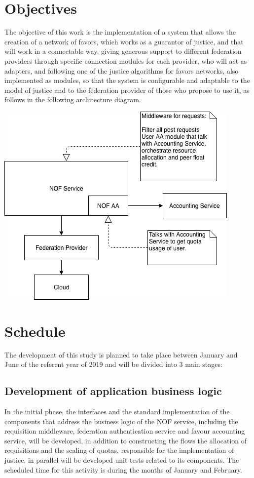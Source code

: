 \documentclass{article}
\begin{document}
\section{Objectives}
The objective of this work is the implementation of a system that allows the creation of a network of favors, which works as a guarantor of justice, and that will work in a connectable way, giving generous support to different federation providers through specific connection modules for each provider, who will act as adapters, and following one of the justice algorithms for favors networks, also implemented as modules, so that the system is configurable and adaptable to the model of justice and to the federation provider of those who propose to use it, as follows in the following architecture diagram.

\begin{center}
\includegraphics[scale=0.4]{./image/NOF-architecture-generic.png}
\end{center}

\section{Schedule}

The development of this study is planned to take place between January and June of the referent year of 2019 and will be divided into 3 main stages:
\subsection{Development of application business logic}
	In the initial phase, the interfaces and the standard implementation of the components that address the business logic of the NOF service, including the requisition middleware, federation authentication service and favour accounting service, will be developed, in addition to constructing the flows the allocation of requisitions and the scaling of quotas, responsible for the implementation of justice, in parallel will be developed unit tests related to its components. The scheduled time for this activity is during the months of January and February.
\end{document}
